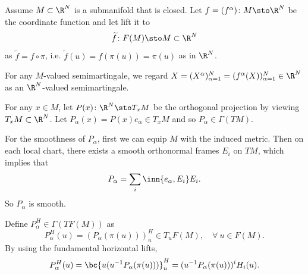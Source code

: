 Assume $M \subset \R^N$ is a submanifold that is closed. Let $f = (f^\alpha) \colon M \sto \R^N$ be the coordinate function and let lift it to
\begin{equation*}
    \widetilde{f} \colon F(M) \sto M \subset \R^N
\end{equation*}
as $\widetilde{f} = f \circ \pi$, i.e. $\widetilde{f}(u) = f(\pi(u)) = \pi(u)$ as in $\R^N$. 

For any $M$-valued semimartingale, we regard $X = (X^\alpha)_{\alpha = 1}^N = (f^\alpha(X))_{\alpha = 1}^N \in \R^N$ as an $\R^N$-valued semimartingale. 

For any $x \in M$, let $P(x) \colon \R^N \sto T_xM$ be the orthogonal projection by viewing $T_xM \subset \R^N$. Let $P_\alpha(x) = P(x)e_\alpha \in T_xM$ and so $P_\alpha \in \Gamma(TM)$. 
\begin{rmk}
    For the smoothness of $P_\alpha$, first we can equip $M$ with the induced metric. Then on each local chart, there exists a smooth orthonormal frames $E_i$ on $TM$, which implies that
    \begin{equation*}
        P_\alpha = \sum_i \inn{e_\alpha,E_i}E_i.
    \end{equation*}
    So $P_\alpha$ is smooth.
\end{rmk}

Define $P^H_\alpha \in \Gamma(TF(M))$ as
\begin{equation*}
    P^H_\alpha(u) = (P_\alpha(\pi(u)))_u^H \in T_uF(M),\quad \forall~ u \in F(M).
\end{equation*}
By using the fundamental horizontal lifts,
\begin{equation*}
    P^H_\alpha(u) = \bc{u (u^{-1}P_\alpha(\pi(u)))}_u^H = (u^{-1}P_\alpha(\pi(u)))^{i}H_i(u).
\end{equation*}

